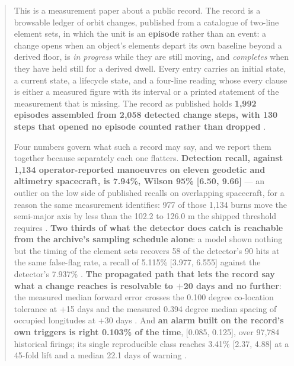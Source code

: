 \documentclass[11pt]{article}
\begin{document}
\begin{abstract}

This is a measurement paper about a public record. The record is a browsable ledger of orbit changes, published from a catalogue of two-line element sets, in which the unit is an \textbf{episode} rather than an event: a change opens when an object's elements depart its own baseline beyond a derived floor, is \emph{in progress} while they are still moving, and \emph{completes} when they have held still for a derived dwell. Every entry carries an initial state, a current state, a lifecycle state, and a four-line reading whose every clause is either a measured figure with its interval or a printed statement of the measurement that is missing. The record as published holds \textbf{1,992 episodes assembled from 2,058 detected change steps, with 130 steps that opened no episode counted rather than dropped}%
.

Four numbers govern what such a record may say, and we report them together because separately each one flatters. \textbf{Detection recall, against 1,134 operator-reported manoeuvres on eleven geodetic and altimetry spacecraft, is 7.94\%, Wilson 95\% [6.50, 9.66]} --- an outlier on the low side of published recalls on overlapping spacecraft, for a reason the same measurement identifies: 977 of those 1,134 burns move the semi-major axis by less than the 102.2 to 126.0 m the shipped threshold requires%
. \textbf{Two thirds of what the detector does catch is reachable from the archive's sampling schedule alone}: a model shown nothing but the timing of the element sets recovers 58 of the detector's 90 hits at the same false-flag rate, a recall of 5.115\% [3.977, 6.555] against the detector's 7.937\%%
. \textbf{The propagated path that lets the record say what a change reaches is resolvable to +20 days and no further}: the measured median forward error crosses the 0.100 degree co-location tolerance at +15 days and the measured 0.394 degree median spacing of occupied longitudes at +30 days%
. And \textbf{an alarm built on the record's own triggers is right 0.103\% of the time}, [0.085, 0.125], over 97,784 historical firings; its single reproducible class reaches 3.41\% [2.37, 4.88] at a 45-fold lift and a median 22.1 days of warning%
.


\end{abstract}
\end{document}
